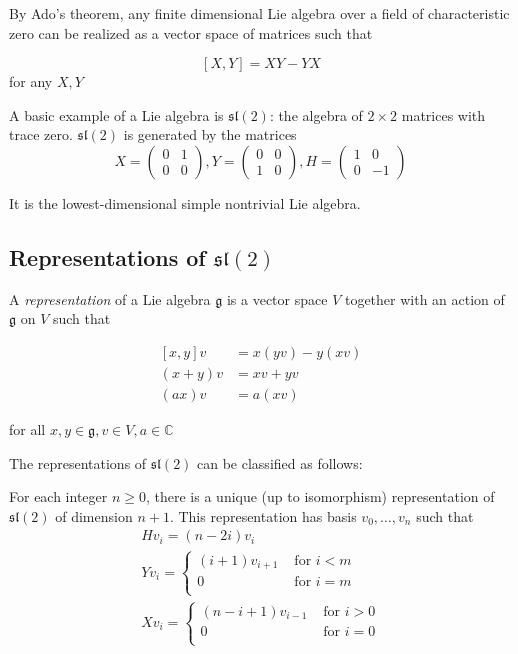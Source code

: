 \documentclass[]{article}
\newcommand{\sll}{\mathfrak{sl}}
\numberwithin{equation}{subsection}
\begin{document}
By Ado's theorem, any finite dimensional Lie algebra over a field of characteristic zero can be realized as a vector space of matrices such that 

\[ \left[ X,Y \right] = XY - YX\] 
for any $X,Y$

A basic example of a Lie algebra is $\sll(2)$: the algebra of $2 \times 2$ matrices with trace zero. $\sll(2)$ is generated by the matrices 
\begin{equation}
    X = \begin{pmatrix} 0 & 1 \\ 0 & 0 \end{pmatrix},
    Y = \begin{pmatrix} 0 & 0 \\ 1 & 0 \end{pmatrix}, 
    H = \begin{pmatrix} 1 & 0 \\ 0 &-1 \end{pmatrix}
\end{equation}

It is the lowest-dimensional simple nontrivial Lie algebra. 

\subsection{Representations of $\sll(2)$}

A \emph{representation} of a Lie algebra $\mathfrak{g}$ is a vector space $V$ together with an action of $\mathfrak{g}$ on $V$ such that 

\begin{align*}
    \left[ x,y \right] v &= x(yv) - y(xv) \\
    (x+y)v &= xv + yv \\
    (ax)v &= a(xv)
\end{align*}

for all $x,y \in \mathfrak{g}, v \in V, a \in \mathbb{C}$

The representations of $\sll(2)$ can be classified as follows: 

For each integer $n \geq 0$, there is a unique (up to isomorphism) representation of $\sll(2)$ of dimension $n+1$. This representation has basis $v_0, \ldots, v_{n}$ such that
\begin{align*}
    &H v_i = (n - 2i) v_i& \\
    &Y v_i = \begin{cases} 
                (i+1)v_{i+1}& \text{ for $i < m$} \\
                0& \text{ for $i = m$} \\
            \end{cases} \\
    &X v_i = \begin{cases} 
                (n-i+1)v_{i-1}& \text{ for $i > 0$} \\
                0& \text{ for $i = 0$} \\
            \end{cases}
\end{align*}
\end{document}
